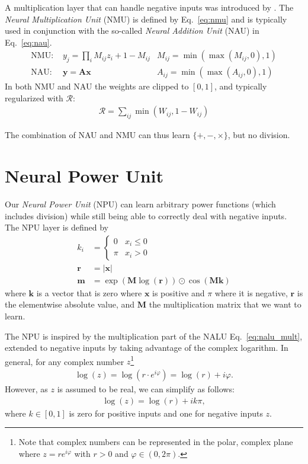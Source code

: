\documentclass[9pt]{article}
\begin{document}
A multiplication layer that can handle negative inputs was introduced by \citet{madsen_neural_2020}.
The \emph{Neural Multiplication Unit} (NMU) is defined by Eq.~\ref{eq:nmu} and is typically used in
conjunction with the so-called \emph{Neural Addition Unit} (NAU) in Eq.~\ref{eq:nau}.
\begin{align}
  \label{eq:nmu}
  \text{NMU: } &y_j = \prod_i M_{ij} z_{i} + 1 - M_{ij}  &M_{ij}=\min(\max(M_{ij}, 0), 1)\\
  \label{eq:nau}
  \text{NAU: } &\bm y = \bm A \bm x &A_{ij}=\min(\max(A_{ij}, 0), 1)
\end{align}
In both NMU and NAU the weights are clipped to $[0,1]$, and typically regularized
with $\mathcal{R}$:
\begin{align}
  \label{eq:rsparse}
  \mathcal{R} = \sum_{ij} \min(W_{ij}, 1-W_{ij})
\end{align}

The combination of NAU and NMU can thus learn $\{+,-,\times\}$, but no division.




\section{Neural Power Unit}%
\label{sec:neural_power_unit}

Our \emph{Neural Power Unit} (NPU) can learn arbitrary power functions (which
includes division) while still being able to correctly deal with negative
inputs.  The NPU layer is defined by
\begin{align}
  k_i &= \begin{cases}
     0  & x_i \leq 0 \\
    \pi & x_i > 0
  \end{cases} \\
  \bm r &= |\bm x| \\
  \bm m &= \exp(\bm M \log(\bm r)) \odot \cos(\bm M \bm k)
\end{align}
where $\bm k$ is a vector that is zero where $\bm x$ is positive and $\pi$
where it is negative, $\bm r$ is the elementwise absolute value, and $\bm M$
the multiplication matrix that we want to learn.

The NPU is inspired by the multiplication part of the NALU
Eq.~\ref{eq:nalu_mult}, extended to negative inputs by taking advantage of the
complex logarithm. In general, for any complex number $z$\footnote{Note that
complex numbers can be represented in the polar, complex plane where
$z=re^{i\varphi}$ with $r>0$ and $\varphi \in (0,2\pi)$.}
\begin{align}
  \log(z) = \log\left(r\cdot e^{i\varphi}\right)
     = \log(r) + i\varphi.
\end{align}
However, as $z$ is assumed to be real, we can simplify as follows:
\begin{align}
  \log(z) = \log(r) + ik\pi,
\end{align}
where $k \in [0,1]$ is zero for positive inputs and one for negative inputs $z$.
\end{document}
